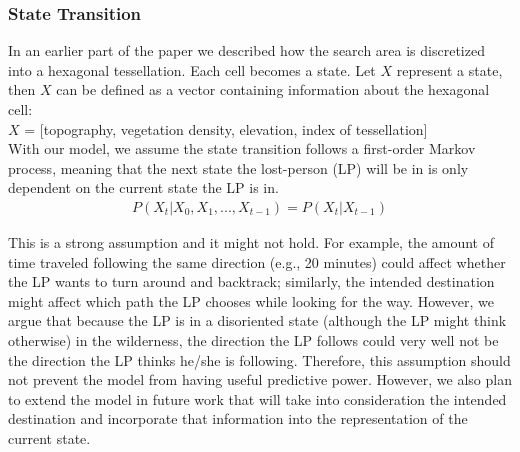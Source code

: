 \documentclass[smallextended,natbib]{svjour3}
\begin{document}
\subsubsection{State Transition}
\label{sec:3.4.2}

In an earlier part of the paper we described how the search area is discretized into a hexagonal tessellation. Each cell becomes a state. Let $X$ represent a state, then $X$ can be defined as a vector containing information about the hexagonal cell:\\

\indent{}$X$ = [topography, vegetation density, elevation, index of tessellation]\\

With our model, we assume the state transition follows a first-order Markov process, meaning that the next state the lost-person (LP) will be in is only dependent on the current state the LP is in.
\begin{align}
\label{FirstOrder}
P(X_t|X_0, X_1, ..., X_{t-1}) = P(X_t|X_{t-1})
\end{align}

This is a strong assumption and it might not hold. For example, the amount of time traveled following the same direction (e.g., 20 minutes) could affect whether the LP wants to turn around and backtrack; similarly, the intended destination might affect which path the LP chooses while looking for the way. However, we argue that because the LP is in a disoriented state (although the LP might think otherwise) in the wilderness, the direction the LP follows could very well not be the direction the LP thinks he/she is following. Therefore, this assumption should not prevent the model from having useful predictive power. However, we also plan to extend the model in future work that will take into consideration the intended destination and incorporate that information into the representation of the current state.
\end{document}
